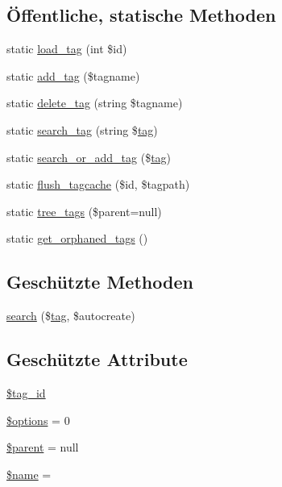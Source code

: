 \subsection*{Öffentliche, statische Methoden}
\begin{DoxyCompactItemize}
\item 
static \hyperlink{classSunhill_1_1Objects_1_1oo__tag_af4c42f6c5a1e0fe0c19878b1cd836929}{load\+\_\+tag} (int \$id)
\item 
static \hyperlink{classSunhill_1_1Objects_1_1oo__tag_a536626cc877d89abed72d56d49706b2f}{add\+\_\+tag} (\$tagname)
\item 
static \hyperlink{classSunhill_1_1Objects_1_1oo__tag_aa79454c1b8989fa94af60606eabb57a4}{delete\+\_\+tag} (string \$tagname)
\item 
static \hyperlink{classSunhill_1_1Objects_1_1oo__tag_a206bd99fd66ad93043ed6ce8235d9a46}{search\+\_\+tag} (string \$\hyperlink{classApp_1_1tag}{tag})
\item 
static \hyperlink{classSunhill_1_1Objects_1_1oo__tag_ac951aac4bb12d11f2ab11a0aee1a53b7}{search\+\_\+or\+\_\+add\+\_\+tag} (\$\hyperlink{classApp_1_1tag}{tag})
\item 
static \hyperlink{classSunhill_1_1Objects_1_1oo__tag_a0b3318ddf5a874529333a23817b54937}{flush\+\_\+tagcache} (\$id, \$tagpath)
\item 
static \hyperlink{classSunhill_1_1Objects_1_1oo__tag_ac74fc14c9e66fadf58c703afdc26a309}{tree\+\_\+tags} (\$parent=null)
\item 
static \hyperlink{classSunhill_1_1Objects_1_1oo__tag_a06f8c176d345943a9845d449f27fad34}{get\+\_\+orphaned\+\_\+tags} ()
\end{DoxyCompactItemize}
\subsection*{Geschützte Methoden}
\begin{DoxyCompactItemize}
\item 
\hyperlink{classSunhill_1_1Objects_1_1oo__tag_af2a459224abd667fbe324b53502f11f4}{search} (\$\hyperlink{classApp_1_1tag}{tag}, \$autocreate)
\end{DoxyCompactItemize}
\subsection*{Geschützte Attribute}
\begin{DoxyCompactItemize}
\item 
\hyperlink{classSunhill_1_1Objects_1_1oo__tag_a41a5c53f76d6771a3881e2609e7d7270}{\$tag\+\_\+id}
\item 
\hyperlink{classSunhill_1_1Objects_1_1oo__tag_ab7cc1b66ca7d44b40960d99a83e708de}{\$options} = 0
\item 
\hyperlink{classSunhill_1_1Objects_1_1oo__tag_a4ac4ce6a3d9bc37fc8b4a41b9dfd9b47}{\$parent} = null
\item 
\hyperlink{classSunhill_1_1Objects_1_1oo__tag_a9dbc361cff89d3d27f75574fcb4ca2ec}{\$name} = \textquotesingle{}\textquotesingle{}
\end{DoxyCompactItemize}


